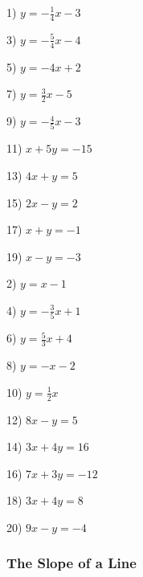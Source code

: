 \documentclass[11pt]{book}
\theoremstyle{definition}  %
\begin{document}
\begin{multicols}{2}
  1) $y = - \frac{1}{4} x - 3$
  
  3) $y = - \frac{5}{4} x - 4$
  
  5) $y = - 4 x + 2$
  
  7) $y = \frac{3}{2} x - 5$
  
  9) $y = - \frac{4}{5} x - 3$
  
  11) $x + 5 y = - 15$
  
  13) $4 x + y = 5$
  
  15) $2 x - y = 2$
  
  17) $x + y = - 1$
  
  19) $x - y = - 3$
  
  2) $y = x - 1$
  
  4) $y = - \frac{3}{5} x + 1$
  
  6) $y = \frac{5}{3} x + 4$
  
  8) $y = - x - 2$
  
  10) $y = \frac{1}{2} x$
  
  12) $8 x - y = 5$
  
  14) $3 x + 4 y = 16$
  
  16) $7 x + 3 y = - 12$
  
  18) $3 x + 4 y = 8$
  
  20) $9 x - y = - 4$
\end{multicols}

\pagebreak

\subsubsection{The Slope of a Line}\par
\end{document}
